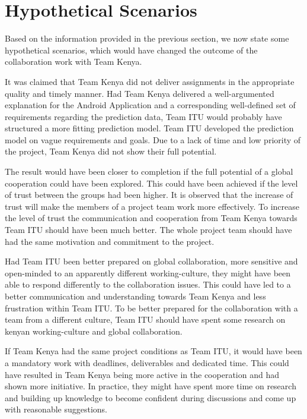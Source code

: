 
\section{Hypothetical Scenarios}

Based on the information provided in the previous section, we now state some hypothetical scenarios, which would have changed the outcome of the collaboration work with Team Kenya.

It was claimed that Team Kenya did not deliver assignments in the appropriate quality and timely manner. Had Team Kenya delivered a well-argumented explanation for the Android Application and a corresponding well-defined set of requirements regarding the prediction data, Team ITU would probably have structured a more fitting prediction model. Team ITU developed the prediction model on vague requirements and goals. Due to a lack of time and low priority of the project, Team Kenya did not show their full potential.

The result would have been closer to completion if the full potential of a global cooperation could have been explored. This could have been achieved if the level of trust between the groups had been higher. It is observed that the increase of trust will make the members of a project team work more effectively\cite{trust}. To increase the level of trust the communication and cooperation from Team Kenya towards Team ITU should have been much better. The whole project team should have had the same motivation and commitment to the project.


Had Team ITU been better prepared on global collaboration, more sensitive and open-minded to an apparently different working-culture, they might have been able to respond differently to the collaboration issues. This could have led to a better communication and understanding towards Team Kenya and less frustration within Team ITU. To be better prepared for the collaboration with a team from a different culture, Team ITU should have spent some research on kenyan working-culture and global collaboration. 

If Team Kenya had the same project conditions as Team ITU, it would have been a mandatory work with deadlines, deliverables and dedicated time. This could have resulted in Team Kenya being more active in the cooperation and had shown more initiative. In practice, they might have spent more time on research and building up knowledge to become confident during discussions and come up with reasonable suggestions.